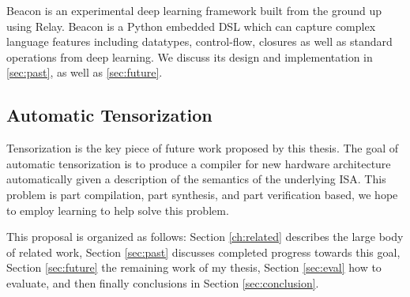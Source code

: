 Beacon is an experimental deep learning framework built from the ground up
  using Relay.
Beacon is a Python embedded DSL which can capture
  complex language features including datatypes, control-flow, closures
  as well as standard operations from deep learning.
We discuss its design and implementation in \ref{sec:past}, as well as \ref{sec:future}.

\subsection{Automatic Tensorization}

Tensorization is the key piece of future work proposed by this thesis.
The goal of automatic tensorization is to produce a compiler for new
hardware architecture automatically given a description of the semantics
of the underlying ISA.
This problem is part compilation, part synthesis, and part verification based,
  we hope to employ learning to help solve this problem.

This proposal is organized as follows:
  Section \ref{ch:related} describes the large body of related work,
  Section \ref{sec:past} discusses completed progress towards this goal,
  Section \ref{sec:future} the remaining work of my thesis,
  Section \ref{sec:eval} how to evaluate,
  and then finally conclusions in Section \ref{sec:conclusion}.





